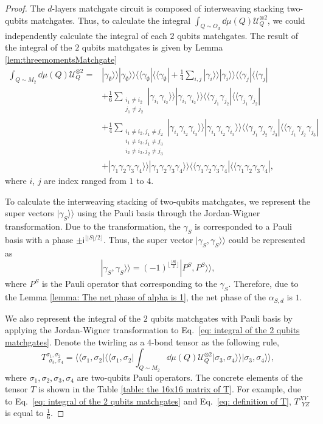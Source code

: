 \documentclass{article}
\newcommand{\ii}{\mathsf{i}}
\newcommand{\supket}[1]{|#1 \rangle\rangle}
\newcommand{\supbra}[1]{\langle\langle #1 |}
\newcommand{\supketbra}[2]{
    \supket{#1 } \supket{#1 } \supbra{#2} \supbra{#2} 
}
\newcommand{\floor}[1]{\lfloor #1 \rfloor}
\begin{document}
\begin{proof}
The $d$-layers matchgate circuit is composed of interweaving stacking two-qubits matchgates. Thus, to calculate the integral $\int_{Q \sim O_d} \dd\mu(Q) \mathcal{U}_Q^{\otimes 2}$, we could independently calculate the integral of each $2$ qubits matchgates. The result of the integral of the $2$ qubits matchgates is given by Lemma \ref{lem:threemomentsMatchgate}
\begin{align}
\label{eq: integral of the 2 qubits matchgates}
    \int_{Q\sim M_2} \dd\mu(Q)\mathcal{U}_Q^{\otimes 2} =& \supketbra{\gamma_\emptyset}{\gamma_\emptyset}
    + \frac{1}{4} \sum_{i,j} \supketbra{\gamma_i}{\gamma_j}\\
    &+ \frac{1}{6}\sum_{\substack{i_1\neq i_2 \\ j_1\neq j_2}}\supketbra{\gamma_{i_1}\gamma_{i_2}}{\gamma_{j_1}\gamma_{j_2}} \\
    &+ \frac{1}{4}
    \sum_{\substack{i_1\neq i_2, j_1 \neq j_2 \\ 
        i_1\neq i_3, j_1 \neq j_3 \\
        i_2\neq i_3, j_2 \neq j_3} 
    }
    \supketbra{\gamma_{i_1}\gamma_{i_2}\gamma_{i_3}}{\gamma_{j_1}\gamma_{j_2}\gamma_{j_3}}\\
    &+ \supketbra{\gamma_1\gamma_2\gamma_3\gamma_4}{\gamma_1\gamma_2\gamma_3\gamma_4},
\end{align}
where $i$, $j$ are index ranged from $1$ to $4$. 



To calculate the interweaving stacking of two-qubits matchgates, we represent the super vectors $\supket{\gamma_S}$ using the Pauli basis through the Jordan-Wigner transformation. Due to the transformation, the $\gamma_S$ is corresponded to a Pauli basis with a phase $\pm \ii^{\floor{|S|/2}}$. Thus, the super vector $\supket{\gamma_S, \gamma_S}$ could be represented as 
\begin{equation}
    \supket{\gamma_S, \gamma_S} = (-1)^{\floor{\frac{|S|}{2}}} \supket{P^{S}, P^{S}},
\end{equation}
 where $P^{S}$ is the Pauli operator that corresponding to the $\gamma_S$.
Therefore, due to the Lemma \ref{lemma: The net phase of alpha is 1}, the net phase of the $\alpha_{S,d}$ is $1$. 

We also represent the integral of the $2$ qubits matchgates with Pauli basis by applying the Jordan-Wigner transformation to Eq.~\eqref{eq: integral of the 2 qubits matchgates}. Denote the twirling as a $4$-bond tensor as the following rule,
\begin{equation}
\label{eq: definition of T}
    T^{\sigma_1, \sigma_2}_{~~\sigma_3, \sigma_4} = \supbra{\sigma_1, \sigma_2}\supbra{\sigma_1, \sigma_2}\int_{Q\sim M_2} \dd\mu(Q)\mathcal{U}_Q^{\otimes 2} \supket{\sigma_3, \sigma_4}\supket{\sigma_3, \sigma_4},
\end{equation}
where $\sigma_1, \sigma_2, \sigma_3, \sigma_4$ are two-qubits Pauli operators. The concrete elements of the tensor $T$ is shown in the Table \ref{table: the 16x16 matrix of T}. For example, due to Eq.~\eqref{eq: integral of the 2 qubits matchgates} and Eq.~\eqref{eq: definition of T}, $T^{XY}_{~~YZ}$ is equal to $\frac{1}{6}$. 


\end{proof}
\end{document}
